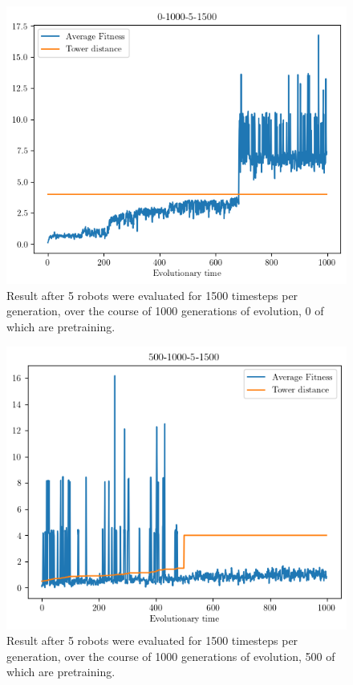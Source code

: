 \documentclass[12pt, a4paper]{article}
\begin{document}
\begin{figure}[h]
	\centering
	\includegraphics[width=1\textwidth]{0-1000-5-1500/0-1000-5-1500.png}
	\caption{Result after 5 robots were evaluated for 1500 timesteps per generation, over the course of 1000 generations of evolution, 0 of which are pretraining.}
	
\end{figure}

\begin{figure}[h]
	\centering
	\includegraphics[width=1\textwidth]{500-1000-5-1500/500-1000-5-1500.png}
	\caption{Result after 5 robots were evaluated for 1500 timesteps per generation, over the course of 1000 generations of evolution, 500 of which are pretraining.}
	
\end{figure}
\end{document}
